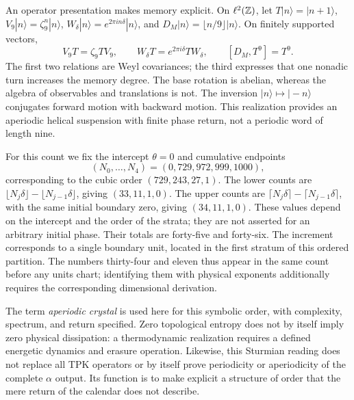 An operator presentation makes memory explicit. On \(\ell^2(\mathbb Z)\), let \(T|n\rangle=|n+1\rangle\), \(V_9|n\rangle=\zeta_9^n|n\rangle\), \(W_\delta|n\rangle=e^{2\pi i n\delta}|n\rangle\), and \(D_M|n\rangle=\lfloor n/9\rfloor|n\rangle\). On finitely supported vectors,
\begin{equation}
 V_9T=\zeta_9TV_9,\qquad
 W_\delta T=e^{2\pi i\delta}TW_\delta,\qquad
 [D_M,T^9]=T^9.
 \label{eq:weyl-relojes}
\end{equation}
The first two relations are Weyl covariances; the third expresses that one nonadic turn increases the memory degree. The base rotation is abelian, whereas the algebra of observables and translations is not. The inversion \(|n\rangle\mapsto|-n\rangle\) conjugates forward motion with backward motion. This realization provides an aperiodic helical suspension with finite phase return, not a periodic word of length nine.



For this count we fix the intercept \(\theta=0\) and cumulative endpoints
\[
(N_0,\ldots,N_4)=(0,729,972,999,1000),
\]
corresponding to the cubic order \((729,243,27,1)\). The lower counts are \(\lfloor N_j\delta\rfloor-\lfloor N_{j-1}\delta\rfloor\), giving \((33,11,1,0)\). The upper counts are \(\lceil N_j\delta\rceil-\lceil N_{j-1}\delta\rceil\), with the same initial boundary zero, giving \((34,11,1,0)\). These values depend on the intercept and the order of the strata; they are not asserted for an arbitrary initial phase. Their totals are forty-five and forty-six. The increment corresponds to a single boundary unit, located in the first stratum of this ordered partition. The numbers thirty-four and eleven thus appear in the same count before any units chart; identifying them with physical exponents additionally requires the corresponding dimensional derivation.

The term \emph{aperiodic crystal} is used here for this symbolic order, with complexity, spectrum, and return specified. Zero topological entropy does not by itself imply zero physical dissipation: a thermodynamic realization requires a defined energetic dynamics and erasure operation. Likewise, this Sturmian reading does not replace all TPK operators or by itself prove periodicity or aperiodicity of the complete \(\alpha\) output. Its function is to make explicit a structure of order that the mere return of the calendar does not describe.




